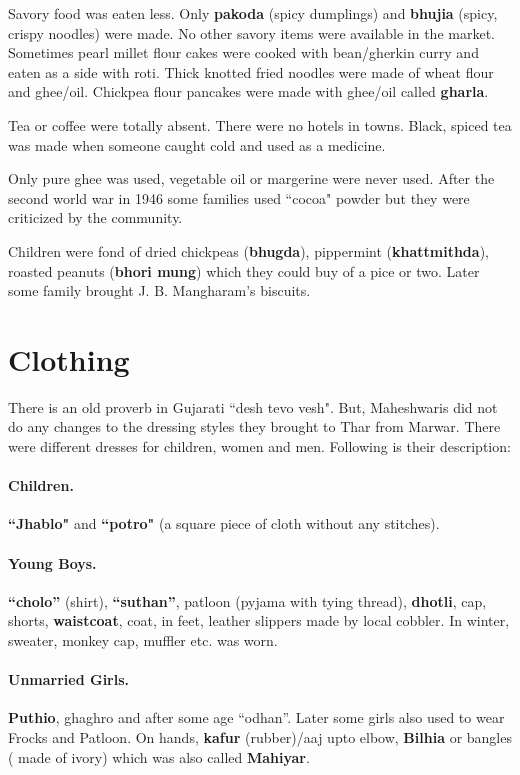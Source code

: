 Savory food was eaten less. Only \textbf{pakoda} (spicy dumplings) and
\textbf{bhujia} (spicy, crispy noodles) were made. No other savory items were
available in the market. Sometimes pearl millet flour cakes were cooked with
bean/gherkin curry and eaten as a side with roti. Thick knotted fried noodles
were made of wheat flour and ghee/oil. Chickpea flour pancakes were made with
ghee/oil called \textbf{gharla}.

Tea or coffee were totally absent. There were no hotels in towns. Black, spiced
tea was made when someone caught cold and used as a medicine.

Only pure ghee was used, vegetable oil or margerine were never used. After the
second world war in 1946 some families used ``cocoa" powder but they were
criticized by the community. 

Children were fond of dried chickpeas (\textbf{bhugda}), pippermint
(\textbf{khattmithda}), roasted peanuts (\textbf{bhori mung}) which they could
buy of a pice or two. Later some family brought J. B. Mangharam's biscuits.

\section{Clothing}
There is an old proverb in Gujarati ``desh tevo vesh". But, Maheshwaris did not
do any changes to the dressing styles they brought to Thar from Marwar. There
were different dresses for children, women and men. Following is their
description:

\paragraph{Children.} \textbf{``Jhablo"} and \textbf{``potro"} (a square piece of cloth without any stitches).

\paragraph{Young Boys.} \textbf{``cholo''} (shirt), \textbf{``suthan''}, patloon
(pyjama with tying thread), \textbf{dhotli}, cap, shorts, \textbf{waistcoat},
coat, in feet, leather slippers made by local cobbler. In winter, sweater,
monkey cap, muffler etc. was worn.
\paragraph{Unmarried Girls.} \textbf{Puthio}, ghaghro and after some age
``odhan''. Later some girls also used to wear Frocks and Patloon. On hands,
\textbf{kafur} (rubber)/aaj upto elbow, \textbf{Bilhia} or bangles ( made of
ivory) which was also called \textbf{Mahiyar}.
